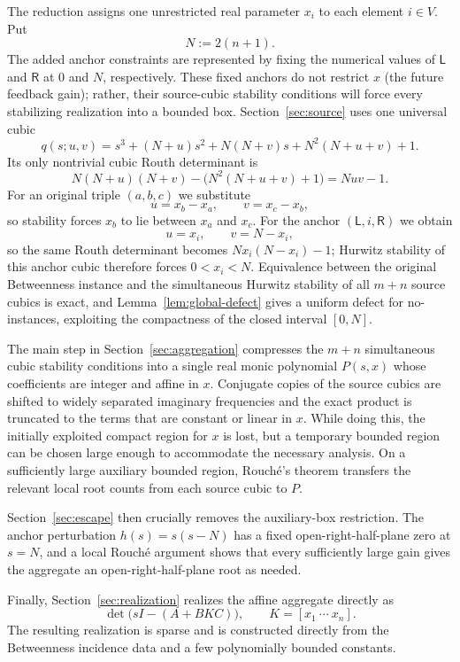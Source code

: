 \documentclass[final,5p,times,twocolumn]{elsarticle}
\begin{document}
The reduction assigns one unrestricted real parameter $x_i$ to each element $i\in V$. Put
\[
N:=2(n+1).
\]
The added anchor constraints are represented by fixing the numerical values of $\mathsf L$ and $\mathsf R$ at $0$ and $N$, respectively. These fixed anchors do not restrict $x$ (the future feedback gain); rather, their source-cubic stability conditions will force every stabilizing realization into a bounded box. Section~\ref{sec:source} uses one universal cubic
\[
q(s;u,v)=s^3+(N+u)s^2+N(N+v)s+N^2(N+u+v)+1.
\]
Its only nontrivial cubic Routh determinant is
\[
N(N+u)(N+v)-\bigl(N^2(N+u+v)+1\bigr)=Nuv-1.
\]
For an original triple $(a,b,c)$ we substitute
\[
u=x_b-x_a,\qquad v=x_c-x_b,
\]
so stability forces $x_b$ to lie between $x_a$ and $x_c$. For the anchor $(\mathsf L,i,\mathsf R)$ we obtain
\[
u=x_i,\qquad v=N-x_i,
\]
so the same Routh determinant becomes $Nx_i(N-x_i)-1$; Hurwitz stability of this anchor cubic therefore forces $0<x_i<N$. Equivalence between the original Betweenness instance and the simultaneous Hurwitz stability of all $m+n$ source cubics is exact, and Lemma~\ref{lem:global-defect} gives a uniform defect for no-instances, exploiting the compactness of the closed interval $[0,N]$.

The main step in Section~\ref{sec:aggregation} compresses the $m+n$ simultaneous cubic stability conditions into a single real monic polynomial $P(s,x)$ whose coefficients are integer and affine in $x$. Conjugate copies of the source cubics are shifted to widely separated imaginary frequencies and the exact product is truncated to the terms that are constant or linear in $x$. While doing this, the initially exploited compact region for $x$ is lost, but a temporary  bounded region can be chosen large enough to accommodate the necessary analysis. On a sufficiently large auxiliary bounded region, Rouch\'e's theorem transfers the relevant local root counts from each source cubic to $P$.

Section~\ref{sec:escape} then crucially removes the auxiliary-box restriction.
The anchor perturbation $h(s)=s(s-N)$ has a fixed open-right-half-plane
zero at $s=N$, and a local Rouch\'e argument shows that every sufficiently
large gain gives the aggregate an open-right-half-plane root as needed.

Finally, Section~\ref{sec:realization} realizes the affine aggregate directly as
\[
\det\bigl(sI-(A+BKC)\bigr),
\qquad K=[x_1\ \cdots\ x_n].
\]
The resulting realization is sparse and is constructed directly from the Betweenness incidence data and a few polynomially bounded constants.
\end{document}

